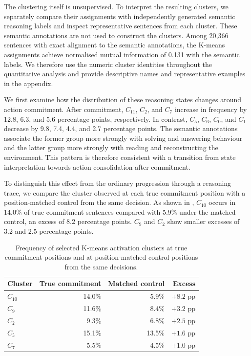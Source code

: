 \documentclass{article}
\begin{document}

The clustering itself is unsupervised. To interpret the resulting clusters, we
separately compare their assignments with independently generated semantic
reasoning labels and inspect representative sentences from each cluster.
These semantic annotations are not used to construct the clusters. Among
20,366 sentences with exact alignment to the semantic annotations, the
K-means assignments achieve normalised mutual information of 0.131 with the
semantic labels. We therefore use the numeric cluster identities throughout
the quantitative analysis and provide descriptive names and representative
examples in the appendix.


We first examine how the distribution of these reasoning states changes around
action commitment. After commitment, \(C_{11}\), \(C_2\), and \(C_7\)
increase in frequency by 12.8, 6.3, and 5.6 percentage points, respectively.
In contrast, \(C_5\), \(C_6\), \(C_0\), and \(C_1\) decrease by 9.8, 7.4,
4.4, and 2.7 percentage points. The semantic annotations associate the former
group more strongly with solving and answering behaviour and the latter group
more strongly with reading and reconstructing the environment. This pattern
is therefore consistent with a transition from state interpretation towards
action consolidation after commitment.

To distinguish this effect from the ordinary progression through a reasoning
trace, we compare the cluster observed at each true commitment position with a
position-matched control from the same decision. As shown in
, \(C_{10}\) occurs in 14.0\% of true
commitment sentences compared with 5.9\% under the matched control, an excess
of 8.2 percentage points. \(C_9\) and \(C_2\) show smaller excesses of 3.2 and
2.5 percentage points.

\begin{table}[htbp]
\centering
\small
\begin{tabular}{lrrr}
\toprule
Cluster & True commitment & Matched control & Excess \\
\midrule
\(C_{10}\) & 14.0\% & 5.9\% & \(+8.2\) pp \\
\(C_9\)    & 11.6\% & 8.4\% & \(+3.2\) pp \\
\(C_2\)    & 9.3\% & 6.8\% & \(+2.5\) pp \\
\(C_5\)    & 15.1\% & 13.5\% & \(+1.6\) pp \\
\(C_7\)    & 5.5\% & 4.5\% & \(+1.0\) pp \\
\bottomrule
\end{tabular}
\caption{Frequency of selected K-means activation clusters at true commitment
positions and at position-matched control positions from the same decisions.}
\label{tab:commitment-clusters}
\end{table}
\end{document}
